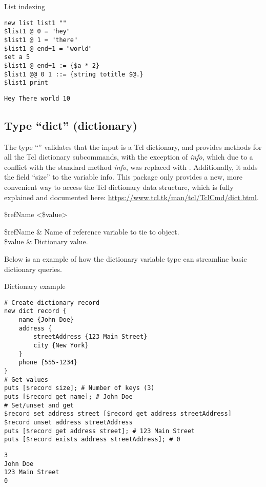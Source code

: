 \documentclass{article}
\begin{document}
\begin{example}{List indexing}
\begin{lstlisting}
new list list1 ""
$list1 @ 0 = "hey"
$list1 @ 1 = "there"
$list1 @ end+1 = "world"
set a 5
$list1 @ end+1 := {$a * 2}
$list1 @@ 0 1 ::= {string totitle $@.}
$list1 print
\end{lstlisting}
\tcblower
\begin{lstlisting}
Hey There world 10
\end{lstlisting}
\end{example}

\clearpage
\subsection{Type ``dict'' (dictionary)}
The type ``'' validates that the input is a Tcl dictionary, and provides methods for all the Tcl dictionary subcommands, with the exception of \textit{info}, which due to a conflict with the standard method \textit{info}, was replaced with . 
Additionally, it adds the field ``size'' to the variable info. 
This package only provides a new, more convenient way to access the Tcl dictionary data structure, which is fully explained and documented here: \url{https://www.tcl.tk/man/tcl/TclCmd/dict.html}.
\begin{syntax}
 \$refName <\$value>
\end{syntax}
\begin{args}
\$refName & Name of reference variable to tie to object. \\
\$value & Dictionary value.
\end{args}
Below is an example of how the dictionary variable type can streamline basic dictionary queries.
\begin{example}{Dictionary example}
\begin{lstlisting}
# Create dictionary record
new dict record {
    name {John Doe}
    address {
        streetAddress {123 Main Street}
        city {New York}
    }
    phone {555-1234} 
}
# Get values
puts [$record size]; # Number of keys (3)
puts [$record get name]; # John Doe
# Set/unset and get
$record set address street [$record get address streetAddress]
$record unset address streetAddress
puts [$record get address street]; # 123 Main Street
puts [$record exists address streetAddress]; # 0
\end{lstlisting}
\tcblower
\begin{lstlisting}
3
John Doe
123 Main Street
0
\end{lstlisting}
\end{example}
\end{document}
